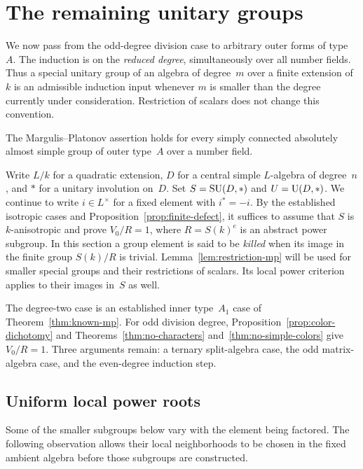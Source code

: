 \section{The remaining unitary groups}
\label{sec:unitary-induction}

We now pass from the odd-degree division case to arbitrary outer forms of
type~$A$.  The induction is on the \emph{reduced degree}, simultaneously
over all number fields.  Thus a special unitary group of an algebra of
degree~$m$ over a finite extension of~$k$ is an admissible induction input
whenever $m$ is smaller than the degree currently under consideration.
Restriction of scalars does not change this convention.

\begin{theorem}\label{thm:outer-a}
The Margulis--Platonov assertion holds for every simply connected
absolutely almost simple group of outer type~$A$ over a number field.
\end{theorem}

Write $L/k$ for a quadratic extension, $D$ for a central simple
$L$-algebra of degree~$n$, and $*$ for a unitary involution on~$D$.
Set $S=\operatorname{SU}(D,*)$ and $U=\operatorname{U}(D,*)$.  We continue to write $i\in L^\times$
for a fixed element with $i^*=-i$.  By the established isotropic cases
and Proposition~\ref{prop:finite-defect}, it suffices to assume that $S$
is $k$-anisotropic and prove $V_0/R=1$, where $R=S(k)^e$ is an abstract
power subgroup.  In this section a group element is said to be
\emph{killed} when its image in the finite group $S(k)/R$ is trivial.
Lemma~\ref{lem:restriction-mp} will be used for smaller special groups
and their restrictions of scalars.  Its local power criterion applies
to their images in~$S$ as well.

The degree-two case is an established inner type~$A_1$ case of
Theorem~\ref{thm:known-mp}.  For odd division degree,
Proposition~\ref{prop:color-dichotomy} and
Theorems~\ref{thm:no-characters} and~\ref{thm:no-simple-colors} give
$V_0/R=1$.  Three arguments remain: a ternary split-algebra case, the
odd matrix-algebra case, and the even-degree induction step.

\subsection{Uniform local power roots}

Some of the smaller subgroups below vary with the element being
factored.  The following observation allows their local neighborhoods
to be chosen in the fixed ambient algebra before those subgroups are
constructed.

